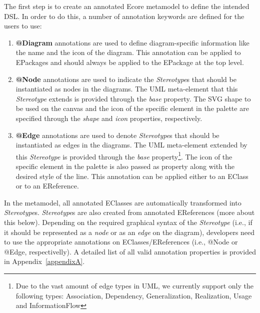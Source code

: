The first step is to create an annotated Ecore metamodel to define the intended DSL.
In order to do this, a number of annotation keywords are defined for the users to use:

\begin{enumerate}[label=\arabic*.]
	\item \textbf{@Diagram} annotations are used to define diagram-specific information like the name and the icon of the diagram. This annotation can be applied to EPackages and should always be applied to the EPackage at the top level.
	\item \textbf{@Node} annotations are used to indicate the  \textit{Stereotype}s that should be instantiated as nodes in the diagrams. 
	The UML meta-element that this  \textit{Stereotype} extends is provided through the \emph{base} property. 
	The SVG shape to be used on the canvas and the icon of the specific element in the palette are specified through the \emph{shape} and \emph{icon} properties, respectively. 
	\item \textbf{@Edge} annotations are used to denote  \textit{Stereotype}s that should be instantiated as edges in the diagrams. 
	The UML meta-element extended by this  \textit{Stereotype} is provided through the \emph{base} property\footnote{Due to the vast amount of edge types in UML, we currently support only the following types: Association, Dependency, Generalization, Realization, Usage and InformationFlow}. The icon of the specific element in the palette is also passed as property along with the desired style of the line. 
	This annotation can be applied either to an EClass or to an EReference.
\end{enumerate}

In the metamodel, all annotated EClasses are automatically transformed into \textit{Stereotype}s.
\textit{Stereotype}s are also created from annotated EReferences (more about this below). 
Depending on the required graphical syntax of the \textit{Stereotype} (i.e., if it should be represented as a \textit{node} or as an \textit{edge} on the diagram), developers need to use the appropriate annotations on EClasses/EReferences (i.e., @Node or @Edge, respectivelly). 
A detailed list of all valid annotation properties is provided in Appendix~\ref{appendixA}. 

